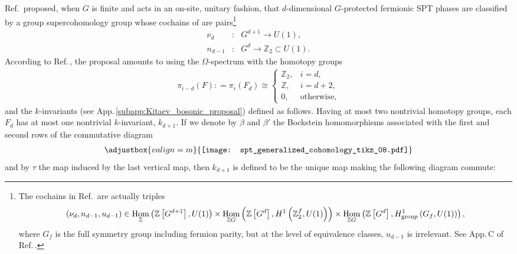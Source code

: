 \documentclass[sort&compress]{elsarticle}
\theoremstyle{theoremstyle}
\theoremstyle{framedtheoremstyle}
\theoremstyle{definitionstyle}
\theoremstyle{definitionstyle}
\theoremstyle{definitionstyle}
\theoremstyle{definitionstyle}
\theoremstyle{nameddefinitionstyle}
\theoremstyle{framednameddefinitionstyle}
\theoremstyle{proofstyle}
\theoremstyle{definitionstyle}
\newcommand{\fromto}{\rightarrow}
\newcommand{\ZZZ}{\mathbb{Z}}
\newcommand{\RRR}{\mathbb{R}}
\DeclareMathOperator{\Hom}{Hom}
\newcommand{\coloneq}{\mathrel{\mathop:}=}
\newcommand{\isomorphic}{\cong}
\newcommand{\paren}[1]{\left( #1 \right)}
\newcommand{\brackets}[1]{\left[ #1 \right]}
\begin{document}
\begin{appendices}
Ref.\,\cite{Wen_Fermion} proposed, when $G$ is finite and acts in an on-site, unitary fashion, that $d$-dimensional $G$-protected fermionic SPT phases are classified by a group supercohomology group whose cochains of are pairs\footnote{%
The cochains in Ref.\,\cite{Wen_Fermion} are actually triples
\begin{equation}
\paren{\nu_d, n_{d-1}, u_{d-1}} \in \Hom_\ZZZ \paren{\ZZZ\brackets{G^{d+1}}, U(1)} \times \Hom_{\ZZZ G} \paren{\ZZZ\brackets{G^d}, H^1\paren{\ZZZ_2^f, U(1)}} \times \Hom_{\ZZZ G}\paren{\ZZZ\brackets{G^d}, H^1_{\rm group}\paren{G_f, U(1)}},
\end{equation}
where $G_f$ is the full symmetry group including fermion parity, but at the level of equivalence classes, $u_{d-1}$ is irrelevant. See App.\,C of Ref.\,\cite{Wen_Fermion}.}
\begin{eqnarray}
\nu_d&:& G^{d+1} \fromto U(1), \\
n_{d-1}&:& G^d \fromto \ZZZ_2 \subset U(1).
\end{eqnarray}
According to Ref.\,\cite{Freed_SRE_iTQFT}, the proposal amounts to using the $\Omega$-spectrum with the homotopy groups
\begin{eqnarray}
\pi_{i-d}\paren{F} \coloneq \pi_i \paren{F_d} \isomorphic \begin{cases}
\ZZZ_2, & i=d, \\
\ZZZ, & i = d+2, \\
0, & \text{otherwise},
\end{cases}
\end{eqnarray}
and the $k$-invariants (see App.\,\ref{subapp:Kitaev_bosonic_proposal}) defined as follows. Having at most two nontrivial homotopy groups, each $F_d$ has at most one nontrivial $k$-invariant, $k_{d+1}$. If we denote by $\beta$ and $\beta'$ the Bockstein homomorphisms \cite{Hatcher} associated with the first and second rows of the commutative diagram
\begin{eqnarray}
\adjustbox{valign=m}{\texttt{[image: spt\_generalized\_cohomology\_tikz\_08.pdf]}}
\end{eqnarray}
and by $\tau$ the map induced by the last vertical map,
then $k_{d+1}$ is defined to be the unique map making the following diagram commute:

\end{appendices}
\end{document}
